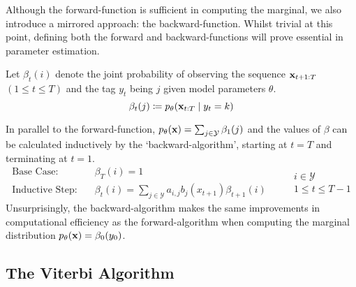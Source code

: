 \documentclass[../main.tex]{subfiles}
\begin{document}
Although the forward-function is sufficient in computing the marginal, we also introduce a mirrored approach: the backward-function.
Whilst trivial at this point, defining both the forward and backward-functions will prove essential in parameter estimation.
\begin{definition} \label{def:backward-func}
    Let $\beta_t(i)$ denote the joint probability of observing the sequence $\mathbf{x}_{t+1:T}$ $(1 \leq t \leq T)$ and the tag $y_t$ being $j$ given model parameters $\theta$.
    \begin{equation*}
        \beta_t(j) \coloneqq p_\theta(\mathbf{x}_{t:T} \mid y_t=k)
    \end{equation*}
\end{definition}
In parallel to the forward-function, $p_\theta(\mathbf{x}) = \sum_{j \in \mathcal{Y}} \beta_1(j)$ and the values of $\beta$ can be calculated inductively by the `backward-algorithm', starting at $t=T$ and terminating at $t=1$.
\begin{equation*}
    \begin{aligned}
        \text{Base Case:} & \quad \beta_T(i) = 1 \\
        \text{Inductive Step:} & \quad \beta_{t}(i) = \sum_{j \in \mathcal{Y}} a_{i,j} b_j(x_{t+1}) \beta_{t+1}(i)
    \end{aligned} \qquad 
        \begin{array}{lr}
            i \in \mathcal{Y} \\
            1 \leq t \leq T-1
        \end{array}
\end{equation*}
Unsurprisingly, the backward-algorithm makes the same improvements in computational efficiency as the forward-algorithm when computing the marginal distribution $p_\theta(\mathbf{x}) = \beta_0(y_0)$.

\subsection{The Viterbi Algorithm}\label{sec:viterbi-algo}
\end{document}
